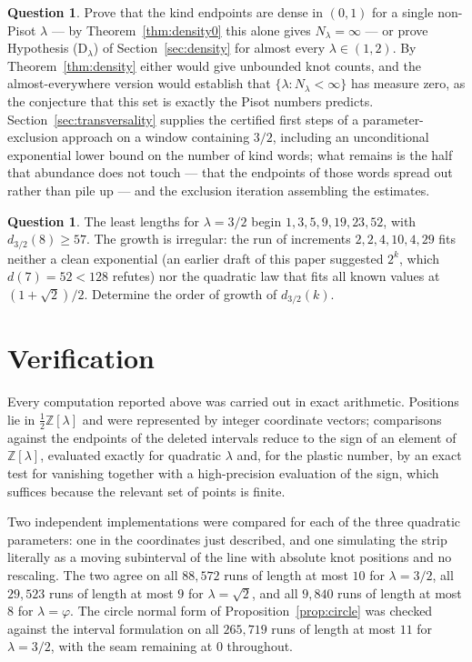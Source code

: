 \documentclass[11pt,reqno]{amsart}
\theoremstyle{plain}
\theoremstyle{definition}
\newtheorem{question}[theorem]{Question}
\theoremstyle{remark}
\newcommand{\Z}{\mathbb{Z}}
\begin{document}
\begin{question}\label{q:ae}
Prove that the kind endpoints are dense in $(0,1)$ for a single non-Pisot
$\lambda$ --- by Theorem~\ref{thm:density0} this alone gives
$N_\lambda=\infty$ --- or prove Hypothesis \textup{(D$_\lambda$)} of
Section~\ref{sec:density} for almost every $\lambda\in(1,2)$. By
Theorem~\ref{thm:density} either would give unbounded knot counts, and the
almost-everywhere version would establish that $\{\lambda:N_\lambda<\infty\}$
has measure zero, as the conjecture that this set is exactly the Pisot numbers
predicts. Section~\ref{sec:transversality} supplies the certified first steps of a
parameter-exclusion approach on a window containing $3/2$, including an
unconditional exponential lower bound on the number of kind words; what
remains is the half that abundance does not touch --- that the endpoints of
those words spread out rather than pile up --- and the exclusion iteration
assembling the estimates.
\end{question}

\begin{question}
The least lengths for $\lambda=3/2$ begin $1,3,5,9,19,23,52$, with
$d_{3/2}(8)\geq57$. The growth is irregular: the run of increments
$2,2,4,10,4,29$ fits neither a clean exponential (an earlier draft of this
paper suggested $2^k$, which $d(7)=52<128$ refutes) nor the quadratic law that
fits all known values at $(1+\sqrt2)/2$. Determine the order of growth of
$d_{3/2}(k)$.
\end{question}

\appendix

\section{Verification}\label{app:verify}

Every computation reported above was carried out in exact arithmetic. Positions
lie in $\tfrac12\Z[\lambda]$ and were represented by integer coordinate vectors;
comparisons against the endpoints of the deleted intervals reduce to the sign of
an element of $\Z[\lambda]$, evaluated exactly for quadratic $\lambda$ and, for
the plastic number, by an exact test for vanishing together with a
high-precision evaluation of the sign, which suffices because the relevant set
of points is finite.

Two independent implementations were compared for each of the three quadratic
parameters: one in the coordinates just described, and one simulating the strip
literally as a moving subinterval of the line with absolute knot positions and
no rescaling. The two agree on all $88{,}572$ runs of length at most $10$ for
$\lambda=3/2$, all $29{,}523$ runs of length at most $9$ for $\lambda=\sqrt2$,
and all $9{,}840$ runs of length at most $8$ for $\lambda=\varphi$. The circle
normal form of Proposition~\ref{prop:circle} was checked against the interval
formulation on all $265{,}719$ runs of length at most $11$ for $\lambda=3/2$,
with the seam remaining at $0$ throughout.
\end{document}
